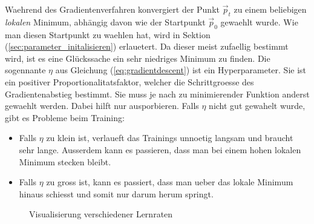 Waehrend des Gradientenverfahren konvergiert der Punkt $\vec{p}_t$ zu einem
beliebigen \textit{lokalen} Minimum, abhängig davon wie der Startpunkt
$\vec{p}_0$ gewaehlt wurde.
Wie man diesen Startpunkt zu waehlen hat, wird in Sektion
(\ref{sec:parameter_initalisieren}) erlauetert.
Da dieser meist zufaellig bestimmt wird, ist es eine Glückssache ein sehr niedriges Minimum zu finden.
\para{}
Die sogennante  $\eta$ aus Gleichung (\ref{eq:gradientdescent}) ist ein Hyperparameter.
Sie ist ein positiver Proportionalitatsfaktor, welcher die Schrittgroesse des Gradientenabstieg bestimmt. Sie muss je nach zu minimierender Funktion anderst gewaehlt werden.
Dabei hilft nur ausporbieren. Falls $\eta$ nicht gut gewahelt wurde, gibt es Probleme beim Training:
\begin{itemize}
\item{Falls $\eta$ zu klein ist, verlaueft das Trainings unnoetig langsam und braucht sehr lange.
    Ausserdem kann es passieren, dass man bei einem hohen lokalen Minimum stecken bleibt.}

\item{Falls $\eta$ zu gross ist, kann es passiert, dass man ueber das lokale
    Minimum hinaus schiesst und somit nur darum herum springt.}
\end{itemize}

\begin{figure}[h!]
  \centering
  \caption{Visualisierung verschiedener Lernraten}
\end{figure}

